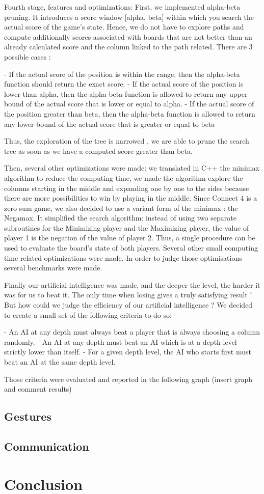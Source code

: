 \documentclass[12pt, a4paper, oneside]{report}
\begin{document}
Fourth stage, features and optimizations:
	First, we implemented alpha-beta pruning. It introduces a score window [alpha, beta] within which you search the actual score of the game’s state. Hence, we do not have to explore paths and compute  additionally scores associated with boards that are not better than an already calculated score and the column linked to the path related. There are 3 possible cases : 
	

- If the actual score of the position is within the range, then the alpha-beta function should return the exact score.
- If the actual score of the position is lower than alpha, then the alpha-beta function is allowed to return any upper bound of the actual score that is lower or equal to alpha.
- If the actual score of the position greater than beta, then the alpha-beta function is allowed to return any lower bound of the actual score that is greater or equal to beta


Thus, the exploration of the tree is narrowed , we are able to prune the search tree as soon as we have a computed score greater than beta.


	Then, several other optimizations were made: we translated in C++ the minimax algorithm to reduce the computing time, we made the algorithm explore the columns starting in the middle and expanding one by one to the sides because there are more possibilities to win by playing in the middle. 
	Since Connect 4 is a zero sum game, we also decided to use a variant form of the minimax : the Negamax. It simplified the search algorithm: instead of using two separate subroutines for the Minimizing player and the Maximizing player, the value of player 1 is the negation of the value of player 2. Thus, a single procedure can be used to evaluate the board’s state of both players.
	Several other small computing time related optimizations were made. In order to judge those optimisations several benchmarks were made.


Finally our artificial intelligence was made, and the deeper the level, the harder it was for us to beat it. The only time when losing gives a truly satisfying result ! But how could we judge the efficiency of our artificial intelligence ? We decided to create a small set of the following criteria to do so:

- An AI at any depth must always beat a player that is always choosing a column randomly.
- An AI at any depth must beat an AI which is at a depth level strictly lower than itself.
- For a given depth level, the AI who starts first must beat an AI at the same depth level.

Those criteria were evaluated and reported in the following graph (insert graph and comment results)


	\section{Gestures}

	\section{Communication}

	\chapter{Conclusion}
\end{document}

